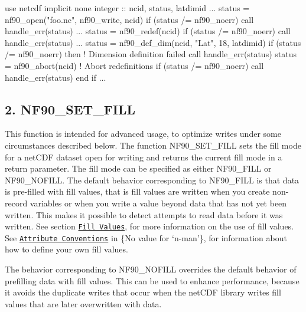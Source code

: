 \begin{DoxyCode}
 \textcolor{keywordtype}{use }netcdf
 \textcolor{keywordtype}{implicit none}
 \textcolor{keywordtype}{integer} :: ncid, status, latdimid
 ...
 status = nf90\_open(\textcolor{stringliteral}{"foo.nc"}, nf90\_write, ncid)
 \textcolor{keywordflow}{if} (status /= nf90\_noerr) \textcolor{keyword}{call }handle\_err(status)
 ...  
 status = nf90\_redef(ncid)
 \textcolor{keywordflow}{if} (status /= nf90\_noerr) \textcolor{keyword}{call }handle\_err(status)
 ...  
 status = nf90\_def\_dim(ncid, \textcolor{stringliteral}{"Lat"}, 18, latdimid)
 \textcolor{keywordflow}{if} (status /= nf90\_noerr) \textcolor{keywordflow}{then} \textcolor{comment}{! Dimension definition failed}
   \textcolor{keyword}{call }handle\_err(status)
   status = nf90\_abort(ncid) \textcolor{comment}{! Abort redefinitions}
   \textcolor{keywordflow}{if} (status /= nf90\_noerr) \textcolor{keyword}{call }handle\_err(status)
\textcolor{keywordflow}{ end if}
...
\end{DoxyCode}
\hypertarget{f90_datasets_f90-nf90_set_fill}{}\subsection{2. N\+F90\+\_\+\+S\+E\+T\+\_\+\+F\+I\+L\+L }\label{f90_datasets_f90-nf90_set_fill}
This function is intended for advanced usage, to optimize writes under some circumstances described below. The function N\+F90\+\_\+\+S\+E\+T\+\_\+\+F\+I\+LL sets the fill mode for a net\+C\+DF dataset open for writing and returns the current fill mode in a return parameter. The fill mode can be specified as either N\+F90\+\_\+\+F\+I\+LL or N\+F90\+\_\+\+N\+O\+F\+I\+LL. The default behavior corresponding to N\+F90\+\_\+\+F\+I\+LL is that data is pre-\/filled with fill values, that is fill values are written when you create non-\/record variables or when you write a value beyond data that has not yet been written. This makes it possible to detect attempts to read data before it was written. See section \href{#Fill-Values}{\tt Fill Values}, for more information on the use of fill values. See \href{netcdf.html#Attribute-Conventions}{\tt Attribute Conventions} in \{No value for ‘n-\/man’\}, for information about how to define your own fill values.

The behavior corresponding to N\+F90\+\_\+\+N\+O\+F\+I\+LL overrides the default behavior of prefilling data with fill values. This can be used to enhance performance, because it avoids the duplicate writes that occur when the net\+C\+DF library writes fill values that are later overwritten with data.

